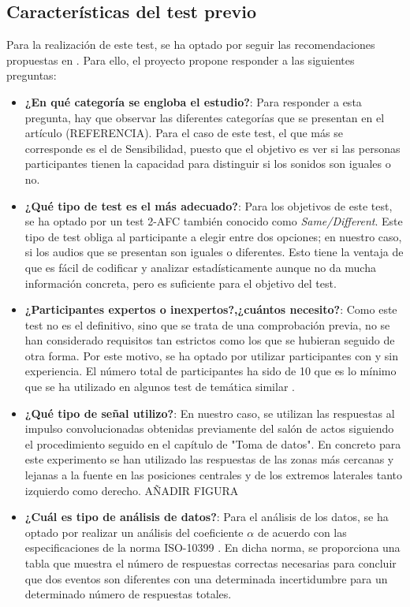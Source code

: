 \documentclass[11pt,a4paper,twoside]{book}
\begin{document}
            \subsection{Características del test previo}
                Para la realización de este test, se ha optado por seguir las recomendaciones propuestas en \cite{Tejada2020}. Para ello, el proyecto propone responder a las siguientes preguntas:
                \begin{itemize}
                    \item \textbf{¿En qué categoría se engloba el estudio?}: Para responder a esta pregunta, hay que observar las diferentes categorías que se presentan en el artículo (REFERENCIA). Para el caso de este test, el que más se corresponde es el de Sensibilidad, puesto que el objetivo es ver si las personas participantes tienen la capacidad para distinguir si los sonidos son iguales o no.
                    \item \textbf{¿Qué tipo de test es el más adecuado?}: Para los objetivos de este test, se ha optado por un test 2-AFC también conocido como \textit{Same/Different}. Este tipo de test obliga al participante a elegir entre dos opciones; en nuestro caso, si los audios que se presentan son iguales o diferentes. Esto tiene la ventaja de que es fácil de codificar y analizar estadísticamente aunque no da mucha información concreta, pero es suficiente para el objetivo del test.
                    \item \textbf{¿Participantes expertos o inexpertos?,¿cuántos necesito?}: Como este test no es el definitivo, sino que se trata de una comprobación previa, no se han considerado requisitos tan estrictos como los que se hubieran seguido de otra forma. Por este motivo, se ha optado por utilizar participantes con y sin experiencia. El número total de participantes ha sido de 10 que es lo mínimo que se ha utilizado en algunos test de temática similar \cite{2019MNowak}.
                    \item \textbf{¿Qué tipo de señal utilizo?}: En nuestro caso, se utilizan las respuestas al impulso convolucionadas obtenidas previamente del salón de actos siguiendo el procedimiento seguido en el capítulo de "Toma de datos". En concreto para este experimento se han utilizado las respuestas de las zonas más cercanas y lejanas a la fuente en las posiciones centrales y de los extremos laterales tanto izquierdo como derecho. AÑADIR FIGURA
                    \item \textbf{¿Cuál es tipo de análisis de datos?}: Para el análisis de los datos, se ha optado por realizar un análisis del coeficiente $\alpha$ de acuerdo con las especificaciones de la norma ISO-10399 \cite{ISO10399}. En dicha norma, se proporciona una tabla que muestra el número de respuestas correctas necesarias para concluir que dos eventos son diferentes con una determinada incertidumbre para un determinado número de respuestas totales.
                \end{itemize}
 
\end{document}
